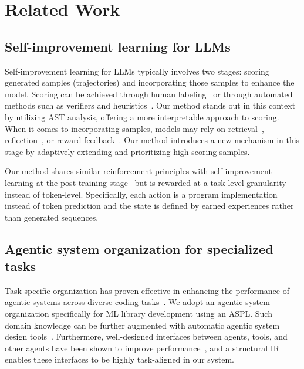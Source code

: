 \section{Related Work}
\subsection{Self-improvement learning for LLMs}
Self-improvement learning for LLMs typically involves two stages: scoring generated samples (trajectories) and incorporating those samples to enhance the model. Scoring can be achieved through human labeling~\cite{cobbe2021training,lightman2023let} or through automated methods such as verifiers and heuristics~\cite{wang2024math,singh2023beyond}. Our method stands out in this context by utilizing AST analysis, offering a more interpretable approach to scoring. When it comes to incorporating samples, models may rely on retrieval~\cite{zhao2024expel,park2023generative}, reflection~\cite{shinn2024reflexion,liu2023reflect}, or reward feedback~\cite{opsahl2024optimizing,fernando2023promptbreeder}. Our method introduces a new mechanism in this stage by adaptively extending and prioritizing high-scoring samples. 

Our method shares similar reinforcement principles with self-improvement learning at the post-training stage~\cite{bai2022constitutional,gulcehre2023reinforced,tian2024toward} but is rewarded at a task-level granularity instead of token-level. Specifically, each action is a program implementation instead of token prediction and the state is defined by earned experiences rather than generated sequences.

\subsection{Agentic system organization for specialized tasks}
Task-specific organization has proven effective in enhancing the performance of agentic systems across diverse coding tasks~\cite{zhang2024caravan,fang2024assertllm,guan2024intelligent}. We adopt an agentic system organization specifically for ML library development using an ASPL. Such domain knowledge can be further augmented with automatic agentic system design tools~\cite{khattab2023dspy,hu2024automated}. Furthermore, well-designed interfaces between agents, tools, and other agents have been shown to improve performance~\cite{schick2023toolformer,yang2024swe,wu2023autogen}, and a structural IR enables these interfaces to be highly task-aligned in our system.

